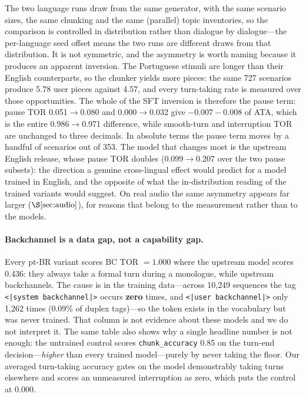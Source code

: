 \documentclass[conference]{IEEEtran}
\begin{document}
The two language runs draw from the same generator, with the same scenario
sizes, the same chunking and the same (parallel) topic inventories, so the
comparison is controlled in distribution rather than dialogue by dialogue---the
per-language seed offset means the two runs are different draws from that
distribution. It is not symmetric, and the asymmetry is worth naming because it
produces an apparent inversion. The Portuguese stimuli are longer than their
English counterparts, so the chunker
yields more pieces: the same 727 scenarios produce 5.78 user pieces against
4.57, and every turn-taking rate is measured over those opportunities. The
whole of the SFT inversion is therefore the pause term: pause TOR
0.051$\rightarrow$0.080 and 0.000$\rightarrow$0.032 give $-0.007-0.008$ of ATA,
which is the entire 0.986$\rightarrow$0.971 difference, while smooth-turn and
interruption TOR are unchanged to three decimals. In absolute terms the pause
term moves by a handful of scenarios out of 353. The model that changes most
is the upstream English release, whose pause TOR doubles (0.099$\rightarrow$0.207
over the two pause subsets): the direction a genuine cross-lingual effect
would predict for a model trained in English, and the opposite of what the
in-distribution reading of the trained variants would suggest. On real audio the
same asymmetry appears far larger ($\S\ref{sec:audio}$), for reasons that belong
to the measurement rather than to the models.

\paragraph{Backchannel is a data gap, not a capability gap.} Every pt-BR variant
scores BC TOR $=1.000$ where the upstream model scores 0.436: they always take a
formal turn during a monologue, while upstream backchannels. The cause is in the
training data---across 10{,}249 sequences the tag
\texttt{<|system backchannel|>} occurs \textbf{zero} times, and
\texttt{<|user backchannel|>} only 1{,}262 times (0.09\% of duplex tags)---so the
token exists in the vocabulary but was never trained. That column is not evidence
about these models and we do not interpret it. The same table also shows why a
single headline number is not enough: the untrained control scores
\texttt{chunk\_accuracy} 0.85 on the turn-end decision---\emph{higher} than every
trained model---purely by never taking the floor. Our averaged turn-taking
accuracy gates on the model demonstrably taking turns elsewhere and scores an
unmeasured interruption as zero, which puts the control at 0.000.
\end{document}
